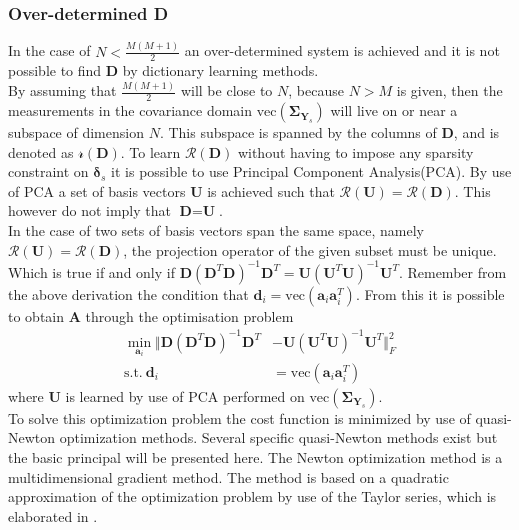 \subsubsection*{Over-determined \textbf{D}}
In the case of $N < \frac{M(M+1)}{2}$ an over-determined system is achieved and it is not possible to find $\textbf{D}$ by dictionary learning methods.\\
By assuming that $\frac{M(M+1)}{2}$ will be close to $N$, because $N>M$ is given, then the measurements in the covariance domain $\text{vec}(\boldsymbol{\Sigma}_{\textbf{Y}_s})$ will live on or near a subspace of dimension $N$. This subspace is spanned by the columns of $\textbf{D}$, and is denoted as $\mathcal{r}(\textbf{D})$. To learn $\mathcal{R}(\textbf{D})$ without having to impose any sparsity constraint on $\boldsymbol{\delta}_s$ it is possible to use Principal Component Analysis(PCA). By use of PCA a set of basis vectors $\textbf{U}$ is achieved such that $\mathcal{R}(\textbf{U})=\mathcal{R}(\textbf{D})$. This however do not imply that $\textbf{D}=\textbf{U}$. \\ 
In the case of two sets of basis vectors span the same space, namely $\mathcal{R}(\textbf{U})=\mathcal{R}(\textbf{D})$, the projection operator of the given subset must be unique. Which is true if and only if $\textbf{D}(\textbf{D}^T\textbf{D})^{-1}\textbf{D}^T=\textbf{U}(\textbf{U}^T\textbf{U})^{-1}\textbf{U}^T$. 
Remember from the above derivation the condition that $\textbf{d}_i = \text{vec}(\textbf{a}_i\textbf{a}_i^T)$. From this it is possible to obtain $\textbf{A}$ through the optimisation problem 
\begin{align}
\min_{\textbf{a}_i}\Vert  \textbf{D}(\textbf{D}^T\textbf{D})^{-1}\textbf{D}^T &- \textbf{U}(\textbf{U}^T\textbf{U})^{-1}\textbf{U}^T \Vert_{F}^{2} \nonumber \\
\text{s.t.} \ \textbf{d}_i&=\text{vec}(\textbf{a}_i\textbf{a}_i^T)\label{eq:Cov_DL2}
\end{align}      
where $\textbf{U}$ is learned by use of PCA performed on $\text{vec}(\boldsymbol{\Sigma}_{\textbf{Y}_s})$.\\ 
To solve this optimization problem 
the cost function is minimized by use of quasi-Newton optimization methods. Several specific quasi-Newton methods exist but the basic principal will be presented here. The Newton optimization method is a multidimensional gradient method. The method is based on a quadratic approximation of the optimization problem by use of the Taylor series, which is elaborated in \cite[p. 29]{Optimization2007}.
